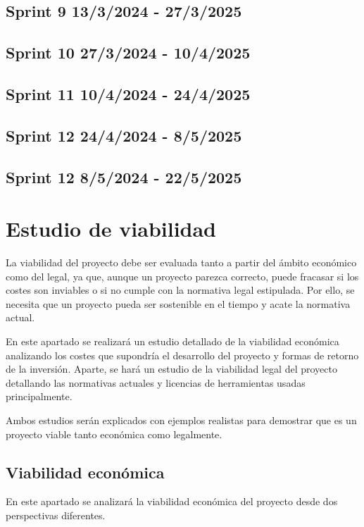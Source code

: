 \subsection{Sprint 9  13/3/2024 - 27/3/2025}


\subsection{Sprint 10  27/3/2024 - 10/4/2025}


\subsection{Sprint 11  10/4/2024 - 24/4/2025}


\subsection{Sprint 12  24/4/2024 - 8/5/2025}


\subsection{Sprint 12  8/5/2024 - 22/5/2025}


\section{Estudio de viabilidad}
La viabilidad del proyecto debe ser evaluada tanto a partir del ámbito económico como del legal, ya que, aunque un proyecto parezca correcto, puede fracasar si los costes son inviables o si no cumple con la normativa legal estipulada.
Por ello, se necesita que un proyecto pueda ser sostenible en el tiempo y acate la normativa actual.

En este apartado se realizará un estudio detallado de la viabilidad económica analizando los costes que supondría el desarrollo del proyecto y formas de retorno de la inversión. Aparte, se hará un estudio de la viabilidad legal del proyecto detallando las normativas actuales y licencias de herramientas usadas principalmente.

Ambos estudios serán explicados con ejemplos realistas para demostrar que es un proyecto viable tanto económica como legalmente.

\subsection{Viabilidad económica}
En este apartado se analizará la viabilidad económica del proyecto desde dos perspectivas diferentes. 

